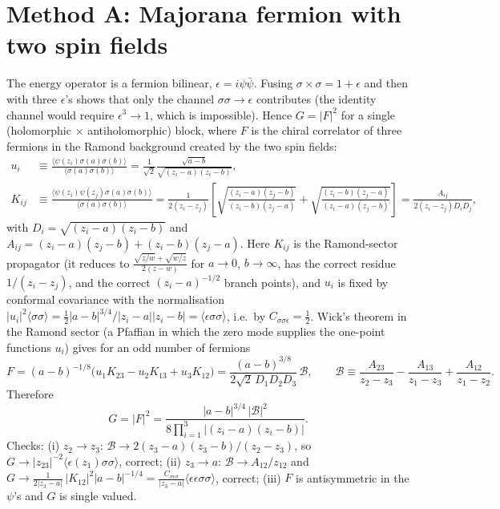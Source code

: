 \documentclass[11pt]{article}
\begin{document}
\section{Method A: Majorana fermion with two spin fields}
The energy operator is a fermion bilinear, $\epsilon=i\psi\bar\psi$. Fusing $\sigma\times\sigma=1+\epsilon$ and then with three $\epsilon$'s shows that only the channel $\sigma\sigma\to\epsilon$ contributes (the identity channel would require $\epsilon^3\to1$, which is impossible). Hence $G=|F|^2$ for a single (holomorphic $\times$ antiholomorphic) block, where $F$ is the chiral correlator of three fermions in the Ramond background created by the two spin fields:
\begin{align}
u_i&\equiv\frac{\langle\psi(z_i)\sigma(a)\sigma(b)\rangle}{\langle\sigma(a)\sigma(b)\rangle}=\frac{1}{\sqrt2}\frac{\sqrt{a-b}}{\sqrt{(z_i-a)(z_i-b)}},\\
K_{ij}&\equiv\frac{\langle\psi(z_i)\psi(z_j)\sigma(a)\sigma(b)\rangle}{\langle\sigma(a)\sigma(b)\rangle}
=\frac{1}{2(z_i-z_j)}\left[\sqrt{\frac{(z_i-a)(z_j-b)}{(z_i-b)(z_j-a)}}+\sqrt{\frac{(z_i-b)(z_j-a)}{(z_i-a)(z_j-b)}}\right]
=\frac{A_{ij}}{2(z_i-z_j)D_iD_j},
\end{align}
with $D_i=\sqrt{(z_i-a)(z_i-b)}$ and $A_{ij}=(z_i-a)(z_j-b)+(z_i-b)(z_j-a)$. Here $K_{ij}$ is the Ramond-sector propagator (it reduces to $\frac{\sqrt{z/w}+\sqrt{w/z}}{2(z-w)}$ for $a\to0$, $b\to\infty$, has the correct residue $1/(z_i-z_j)$, and the correct $(z_i-a)^{-1/2}$ branch points), and $u_i$ is fixed by conformal covariance with the normalisation $|u_i|^2\langle\sigma\sigma\rangle=\frac12|a-b|^{3/4}/|z_i-a||z_i-b|=\langle\epsilon\sigma\sigma\rangle$, i.e.\ by $C_{\sigma\sigma\epsilon}=\frac12$. Wick's theorem in the Ramond sector (a Pfaffian in which the zero mode supplies the one-point functions $u_i$) gives for an odd number of fermions
\begin{equation}
F=(a-b)^{-1/8}\big(u_1K_{23}-u_2K_{13}+u_3K_{12}\big)=\frac{(a-b)^{3/8}}{2\sqrt2\,D_1D_2D_3}\,\mathcal B,\qquad
\mathcal B\equiv\frac{A_{23}}{z_2-z_3}-\frac{A_{13}}{z_1-z_3}+\frac{A_{12}}{z_1-z_2}.
\end{equation}
Therefore
\begin{equation}
G=|F|^2=\frac{|a-b|^{3/4}\,|\mathcal B|^2}{8\prod_{i=1}^3|(z_i-a)(z_i-b)|}.
\label{eq:GA}
\end{equation}
Checks: (i) $z_2\to z_3$: $\mathcal B\to 2(z_3-a)(z_3-b)/(z_2-z_3)$, so $G\to|z_{23}|^{-2}\langle\epsilon(z_1)\sigma\sigma\rangle$, correct; (ii) $z_3\to a$: $\mathcal B\to A_{12}/z_{12}$ and $G\to\frac{1}{2|z_3-a|}\,|K_{12}|^2|a-b|^{-1/4}=\frac{C_{\sigma\epsilon\sigma}}{|z_3-a|}\langle\epsilon\epsilon\sigma\sigma\rangle$, correct; (iii) $F$ is antisymmetric in the $\psi$'s and $G$ is single valued.
\end{document}
